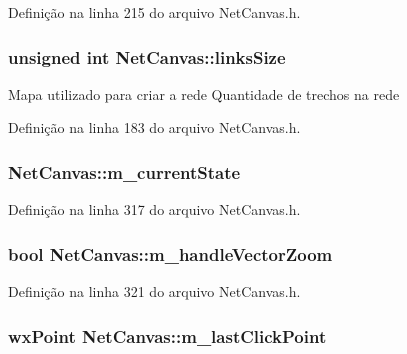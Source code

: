 Definição na linha 215 do arquivo Net\+Canvas.\+h.

\subsubsection[{links\+Size}]{\setlength{\rightskip}{0pt plus 5cm}unsigned int Net\+Canvas\+::links\+Size}\label{class_net_canvas_a4e7bebab6e55baa8a7a1ce5184541f35}
Mapa utilizado para criar a rede Quantidade de trechos na rede 

Definição na linha 183 do arquivo Net\+Canvas.\+h.

\subsubsection[{m\+\_\+current\+State}]{ Net\+Canvas\+::m\+\_\+current\+State\hspace{0.3cm}{\ttfamily [protected]}}\label{class_net_canvas_aa505159284be2266fd4dd0ae8c228544}


Definição na linha 317 do arquivo Net\+Canvas.\+h.

\subsubsection[{m\+\_\+handle\+Vector\+Zoom}]{\setlength{\rightskip}{0pt plus 5cm}bool Net\+Canvas\+::m\+\_\+handle\+Vector\+Zoom\hspace{0.3cm}{\ttfamily [protected]}}\label{class_net_canvas_ad42c2a2ca237702b94477359628b79b3}


Definição na linha 321 do arquivo Net\+Canvas.\+h.

\subsubsection[{m\+\_\+last\+Click\+Point}]{\setlength{\rightskip}{0pt plus 5cm}wx\+Point Net\+Canvas\+::m\+\_\+last\+Click\+Point\hspace{0.3cm}{\ttfamily [protected]}}\label{class_net_canvas_a0cd448a510d14da31f6617b0a916e5b6}


